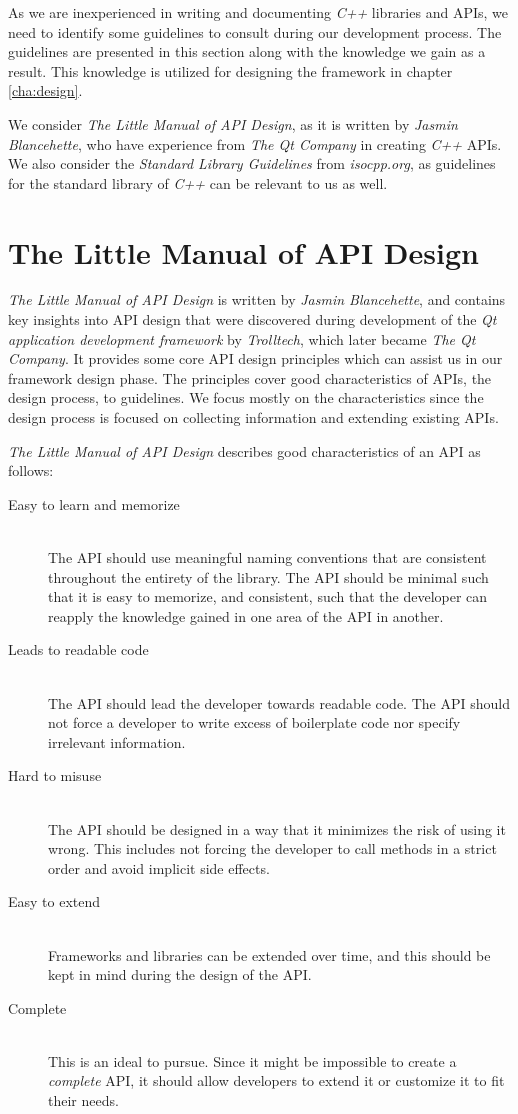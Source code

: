 As we are inexperienced in writing and documenting \textit{C++} libraries and APIs, we need to identify some guidelines to consult during our development process. The guidelines are presented in this section along with the knowledge we gain as a result. This knowledge is utilized for designing the framework in chapter \ref{cha:design}. 

We consider \textit{The Little Manual of API Design}\cite{apiDesignManual}, as it is written by \textit{Jasmin Blancehette}, who have experience from \textit{The Qt Company} in creating \textit{C++} APIs. We also consider the \textit{Standard Library Guidelines}\cite{isoLibDesign} from \textit{isocpp.org}, as guidelines for the standard library of \textit{C++} can be relevant to us as well.

\section{The Little Manual of API Design}
\textit{The Little Manual of API Design} is written by \textit{Jasmin Blancehette}, and contains key insights into API design that were discovered during development of the \textit{Qt application development framework} by \textit{Trolltech}, which later became \textit{The Qt Company}. It provides some core API design principles which can assist us in our framework design phase. The principles cover good characteristics of APIs, the design process, to guidelines. We focus mostly on the characteristics since the design process is focused on collecting information and extending existing APIs.

\textit{The Little Manual of API Design} describes good characteristics of an API as follows:
\begin{description}
\item[Easy to learn and memorize] \hfill \\
The API should use meaningful naming conventions that are consistent throughout the entirety of the library. The API should be minimal such that it is easy to memorize, and consistent, such that the developer can reapply the knowledge gained in one area of the API in another.
\item[Leads to readable code] \hfill \\
The API should lead the developer towards readable code. The API should not force a developer to write excess of boilerplate code nor specify irrelevant information.
\item[Hard to misuse] \hfill \\
The API should be designed in a way that it minimizes the risk of using it wrong. This includes not forcing the developer to call methods in a strict order and avoid implicit side effects.
\item[Easy to extend]\hfill \\
Frameworks and libraries can be extended over time, and this should be kept in mind during the design of the API.
\item[Complete] \hfill \\
This is an ideal to pursue. Since it might be impossible to create a \textit{complete} API, it should allow developers to extend it or customize it to fit their needs.
\end{description}

